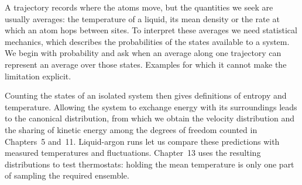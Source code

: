 A trajectory records where the atoms move, but the quantities we seek are
usually averages: the temperature of a liquid, its mean density or the
rate at which an atom hops between sites. To interpret these averages we
need statistical mechanics, which describes the probabilities of the
states available to a system. We begin with probability and ask when an
average along one trajectory can represent an average over those states.
Examples for which it cannot make the limitation explicit.

Counting the states of an isolated system then gives definitions of
entropy and temperature. Allowing the system to exchange energy with its
surroundings leads to the canonical distribution, from which we obtain
the velocity distribution and the sharing of kinetic energy among the
degrees of freedom counted in Chapters~5 and~11. Liquid-argon runs let us
compare these predictions with measured temperatures and fluctuations.
Chapter~13 uses the resulting distributions to test thermostats: holding
the mean temperature is only one part of sampling the required ensemble.
